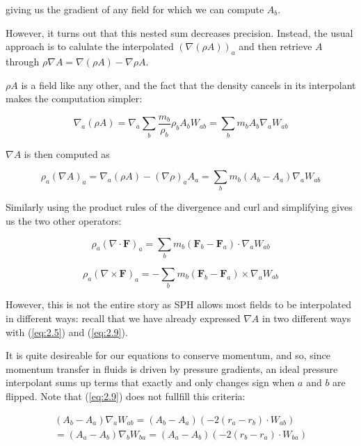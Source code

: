 \documentclass[../main.tex]{subfiles}
\begin{document}
giving us the gradient of any field for which we can compute $A_b$.

However, it turns out \autocite{monaghan1992} that this nested sum decreases precision. Instead, the
usual approach is to calulate the interpolated $(\nabla(\rho A))_a$ and then retrieve $A$ through
$\rho\nabla A = \nabla(\rho A) - \nabla\rho A$.

$\rho A$ is a field like any other, and the fact that the density cancels in its interpolant makes
the computation simpler:

\begin{equation}
    \nabla_a (\rho A)
    = \nabla_a \sum_b \frac{m_b}{\rho_b} \rho_b A_b W_{ab}
    = \sum_b m_b A_b \nabla_a W_{ab}
\end{equation}

$\nabla A$ is then computed as

\begin{equation} \label{eq:2.9}
    \rho_a (\nabla A)_a
    = \nabla_a (\rho A) - (\nabla\rho)_a A_a
    = \sum_b m_b (A_b - A_a) \nabla_a W_{ab}
\end{equation}

Similarly using the product rules of the divergence and curl and simplifying gives us the two other
operators:

\begin{equation}
    \rho_a (\nabla\cdot\bm{F})_a
    = \sum_b m_b (\bm{F}_b - \bm{F}_a) \cdot \nabla_a W_{ab}
\end{equation}

\begin{equation}
    \rho_a (\nabla\times\bm{F})_a
    = - \sum_b m_b (\bm{F}_b - \bm{F}_a) \times \nabla_a W_{ab}
\end{equation}

However, this is not the entire story as SPH allows most fields to be interpolated in different
ways: recall that we have already expressed $\nabla A$ in two different ways with (\ref{eq:2.5}) and
(\ref{eq:2.9}).

It is quite desireable for our equations to conserve momentum, and so, since momentum transfer in
fluids is driven by pressure gradients, an ideal pressure interpolant sums up terms that exactly and
only changes sign when $a$ and $b$ are flipped. Note that (\ref{eq:2.9}) does not fullfill this
criteria:

\begin{equation}
\begin{split}
    (A_b - A_a) \nabla_a W_{ab} = (A_b - A_a) (-2(r_a - r_b) \cdot W_{ab}) \\
  = (A_a - A_b) \nabla_b W_{ba} = (A_a - A_b) (-2(r_b - r_a) \cdot W_{ba})
\end{split}
\end{equation}
\end{document}
